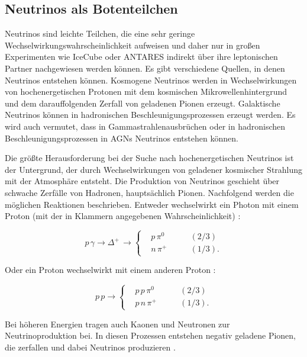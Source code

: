 \subsection{Neutrinos als Botenteilchen}
Neutrinos sind leichte Teilchen, die eine sehr geringe Wechselwirkungswahrscheinlichkeit aufweisen und daher nur in großen Experimenten wie IceCube \cite{Icecube} oder ANTARES \cite{ANTARES} indirekt über ihre leptonischen Partner nachgewiesen werden können.
Es gibt verschiedene Quellen, in denen Neutrinos entstehen können.
Kosmogene Neutrinos werden in Wechselwirkungen von hochenergetischen Protonen mit dem kosmischen Mikrowellenhintergrund und dem darauffolgenden Zerfall von geladenen Pionen erzeugt.
Galaktische Neutrinos können in hadronischen Beschleunigungsprozessen erzeugt werden.
Es wird auch vermutet, dass in Gammastrahlenausbrüchen oder in hadronischen Beschleunigungsprozessen in AGNs Neutrinos entstehen können.

Die größte Herausforderung bei der Suche nach hochenergetischen Neutrinos ist der Untergrund, der durch Wechselwirkungen von geladener kosmischer Strahlung mit der Atmosphäre entsteht.
Die Produktion von Neutrinos geschieht über schwache Zerfälle von Hadronen, hauptsächlich Pionen.
Nachfolgend werden die möglichen Reaktionen beschrieben.
Entweder wechselwirkt ein Photon mit einem Proton (mit der in Klammern angegebenen Wahrscheinlichkeit) \cite{DissBecker}:

\begin{equation*}
p\, \gamma \rightarrow \Delta^+ \, \rightarrow	
\left\{
\begin{aligned}
& p \, \pi^0 & \qquad (2/3) \\
& n \, \pi^+ & \qquad (1/3).
\end{aligned}
\right.
\end{equation*}

Oder ein Proton wechselwirkt mit einem anderen Proton \cite{DissBecker}:

\begin{equation*}
p \, p \rightarrow
\left\{
\begin{aligned}
& p \, p \, \pi^0 & \qquad (2/3) \\
& p \, n \, \pi^+ & \qquad (1/3).
\end{aligned}
\right.
\end{equation*}

Bei höheren Energien tragen auch Kaonen und Neutronen zur Neutrinoproduktion bei.
In diesen Prozessen entstehen negativ geladene Pionen, die zerfallen und dabei Neutrinos produzieren \cite{NeutrinoOszillation}.

